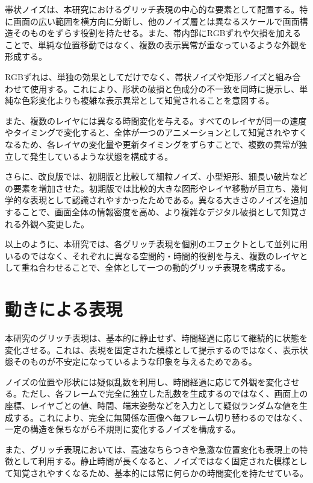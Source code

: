 帯状ノイズは、本研究におけるグリッチ表現の中心的な要素として配置する。特に画面の広い範囲を横方向に分断し、他のノイズ層とは異なるスケールで画面構造そのものをずらす役割を持たせる。また、帯内部にRGBずれや欠損を加えることで、単純な位置移動ではなく、複数の表示異常が重なっているような外観を形成する。

RGBずれは、単独の効果としてだけでなく、帯状ノイズや矩形ノイズと組み合わせて使用する。これにより、形状の破損と色成分の不一致を同時に提示し、単純な色彩変化よりも複雑な表示異常として知覚されることを意図する。

また、複数のレイヤには異なる時間変化を与える。すべてのレイヤが同一の速度やタイミングで変化すると、全体が一つのアニメーションとして知覚されやすくなるため、各レイヤの変化量や更新タイミングをずらすことで、複数の異常が独立して発生しているような状態を構成する。

さらに、改良版では、初期版と比較して細粒ノイズ、小型矩形、細長い破片などの要素を増加させた。初期版では比較的大きな図形やレイヤ移動が目立ち、幾何学的な表現として認識されやすかったためである。異なる大きさのノイズを追加することで、画面全体の情報密度を高め、より複雑なデジタル破損として知覚される外観へ変更した。

以上のように、本研究では、各グリッチ表現を個別のエフェクトとして並列に用いるのではなく、それぞれに異なる空間的・時間的役割を与え、複数のレイヤとして重ね合わせることで、全体として一つの動的グリッチ表現を構成する。


\section{動きによる表現}

本研究のグリッチ表現は、基本的に静止せず、時間経過に応じて継続的に状態を変化させる。これは、表現を固定された模様として提示するのではなく、表示状態そのものが不安定になっているような印象を与えるためである。

ノイズの位置や形状には疑似乱数を利用し、時間経過に応じて外観を変化させる。ただし、各フレームで完全に独立した乱数を生成するのではなく、画面上の座標、レイヤごとの値、時間、端末姿勢などを入力として疑似ランダムな値を生成する。これにより、完全に無関係な画像へ毎フレーム切り替わるのではなく、一定の構造を保ちながら不規則に変化するノイズを構成する。

また、グリッチ表現においては、高速なちらつきや急激な位置変化も表現上の特徴として利用する。静止時間が長くなると、ノイズではなく固定された模様として知覚されやすくなるため、基本的には常に何らかの時間変化を持たせている。

